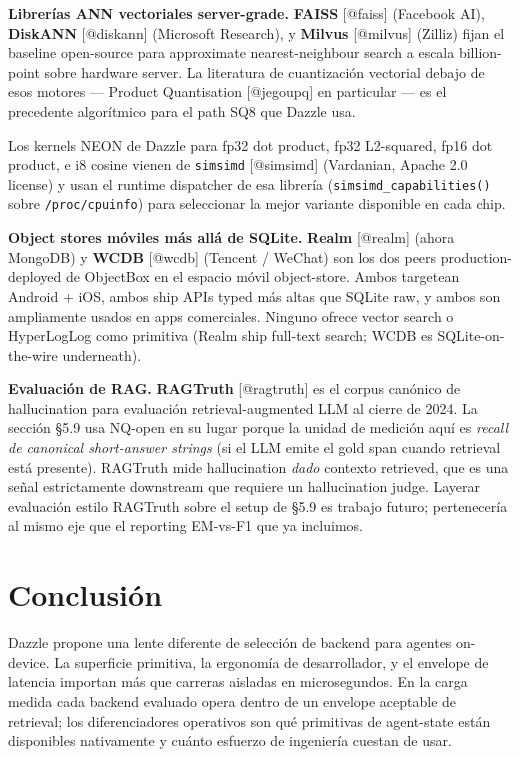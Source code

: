 \textbf{Librerías ANN vectoriales server-grade.} \textbf{FAISS} {[}@faiss{]}
(Facebook AI), \textbf{DiskANN} {[}@diskann{]} (Microsoft Research), y
\textbf{Milvus} {[}@milvus{]} (Zilliz) fijan el baseline open-source para
approximate nearest-neighbour search a escala billion-point sobre hardware
server. La literatura de cuantización vectorial debajo de esos motores ---
Product Quantisation {[}@jegoupq{]} en particular --- es el precedente
algorítmico para el path SQ8 que Dazzle usa.

Los kernels NEON de Dazzle para fp32 dot product, fp32 L2-squared, fp16 dot
product, e i8 cosine vienen de \texttt{simsimd} {[}@simsimd{]} (Vardanian,
Apache 2.0 license) y usan el runtime dispatcher de esa librería
(\texttt{simsimd\_capabilities()} sobre \texttt{/proc/cpuinfo}) para seleccionar
la mejor variante disponible en cada chip.

\textbf{Object stores móviles más allá de SQLite.} \textbf{Realm} {[}@realm{]}
(ahora MongoDB) y \textbf{WCDB} {[}@wcdb{]} (Tencent / WeChat) son los dos peers
production-deployed de ObjectBox en el espacio móvil object-store. Ambos
targetean Android + iOS, ambos ship APIs typed más altas que SQLite raw, y ambos
son ampliamente usados en apps comerciales. Ninguno ofrece vector search o
HyperLogLog como primitiva (Realm ship full-text search; WCDB es
SQLite-on-the-wire underneath).

\textbf{Evaluación de RAG.} \textbf{RAGTruth} {[}@ragtruth{]} es el corpus
canónico de hallucination para evaluación retrieval-augmented LLM al cierre de
2024. La sección §5.9 usa NQ-open en su lugar porque la unidad de medición aquí
es \emph{recall de canonical short-answer strings} (si el LLM emite el gold span
cuando retrieval está presente). RAGTruth mide hallucination \emph{dado}
contexto retrieved, que es una señal estrictamente downstream que requiere un
hallucination judge. Layerar evaluación estilo RAGTruth sobre el setup de §5.9
es trabajo futuro; pertenecería al mismo eje que el reporting EM-vs-F1 que ya
incluimos.

\section{Conclusión}\label{conclusiuxf3n}

Dazzle propone una lente diferente de selección de backend para agentes
on-device. La superficie primitiva, la ergonomía de desarrollador, y el envelope
de latencia importan más que carreras aisladas en microsegundos. En la carga
medida cada backend evaluado opera dentro de un envelope aceptable de retrieval;
los diferenciadores operativos son qué primitivas de agent-state están
disponibles nativamente y cuánto esfuerzo de ingeniería cuestan de usar.

